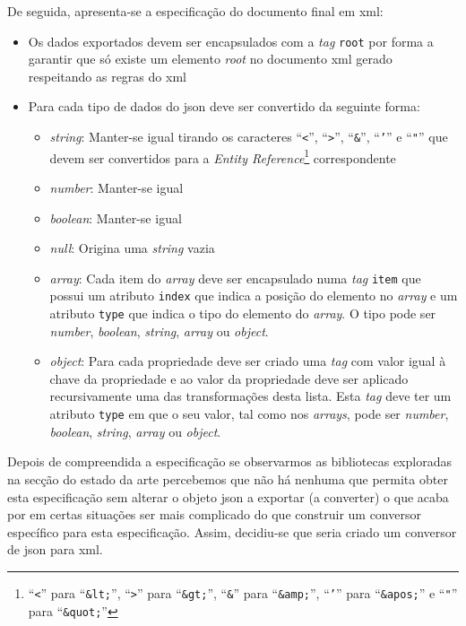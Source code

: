 De seguida, apresenta-se a especificação do documento final em \acrshort{xml}:
\begin{itemize}
    \item Os dados exportados devem ser encapsulados com a \textit{tag} \texttt{root} por forma a garantir que só existe um elemento \textit{root} no documento \acrshort{xml} gerado respeitando as regras do \acrshort{xml}
    \item Para cada tipo de dados do \acrshort{json} deve ser convertido da seguinte forma:
    \begin{itemize}
        \item \textit{string}: Manter-se igual tirando os caracteres ``\texttt{<}'', ``\texttt{>}'', ``\texttt{\&}'', ``\texttt{'}'' e ``\texttt{"}'' que devem ser convertidos para a \textit{Entity Reference}\footnote{``\texttt{<}'' para ``\texttt{\&lt;}'', ``\texttt{>}'' para ``\texttt{\&gt;}'', ``\texttt{\&}'' para ``\texttt{\&amp;}'', ``\texttt{'}'' para ``\texttt{\&apos;}'' e ``\texttt{"}'' para ``\texttt{\&quot;}''} correspondente
        \item \textit{number}: Manter-se igual
        \item \textit{boolean}: Manter-se igual
        \item \textit{null}: Origina uma \textit{string} vazia
        \item \textit{array}: Cada item do \textit{array} deve ser encapsulado numa \textit{tag} \texttt{item} que possui um atributo \texttt{index} que indica a posição do elemento no \textit{array} e um atributo \texttt{type} que indica o tipo do elemento do \textit{array}. O tipo pode ser \textit{number}, \textit{boolean}, \textit{string}, \textit{array} ou \textit{object}.
        \item \textit{object}: Para cada propriedade deve ser criado uma \textit{tag} com valor igual à chave da propriedade e ao valor da propriedade deve ser aplicado recursivamente uma das transformações desta lista. Esta \textit{tag} deve ter um atributo \texttt{type} em que o seu valor, tal como nos \textit{arrays}, pode ser \textit{number}, \textit{boolean}, \textit{string}, \textit{array} ou \textit{object}.
    \end{itemize}
\end{itemize}

Depois de compreendida a especificação se observarmos as bibliotecas exploradas na secção do estado da arte percebemos que não há nenhuma que permita obter esta especificação sem alterar o objeto \acrshort{json} a exportar (a converter) o que acaba por em certas situações ser mais complicado do que construir um conversor específico para esta especificação. Assim, decidiu-se que seria criado um conversor de \acrshort{json} para \acrshort{xml}.

